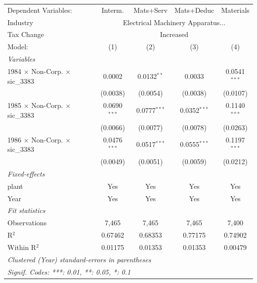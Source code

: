 \documentclass[
  12pt]{article}
\theoremstyle{definition}
\theoremstyle{remark}
\begin{document}
\begin{table}
\begin{minipage}{\linewidth}
\begin{tabular}{lcccc}
   \tabularnewline \midrule \midrule
   Dependent Variables:                          & Interm.        & Mats+Serv      & Mats+Deduc     & Materials\\  
   Industry & \multicolumn{4}{c}{Electrical Machinery Apparatus...} \\ 
   Tax Change & \multicolumn{4}{c}{Increased} \\ 
   Model:                                        & (1)            & (2)            & (3)            & (4)\\  
   \midrule
   \emph{Variables}\\
   1984 $\times$ Non-Corp. $\times$ sic\_3383    & 0.0002         & 0.0132$^{**}$  & 0.0033         & 0.0541$^{***}$\\   
                                                 & (0.0038)       & (0.0054)       & (0.0038)       & (0.0107)\\   
   1985 $\times$ Non-Corp. $\times$ sic\_3383    & 0.0690$^{***}$ & 0.0777$^{***}$ & 0.0352$^{***}$ & 0.1140$^{***}$\\   
                                                 & (0.0066)       & (0.0077)       & (0.0078)       & (0.0263)\\   
   1986 $\times$ Non-Corp. $\times$ sic\_3383    & 0.0476$^{***}$ & 0.0517$^{***}$ & 0.0555$^{***}$ & 0.1197$^{***}$\\   
                                                 & (0.0049)       & (0.0051)       & (0.0059)       & (0.0212)\\   
   \midrule
   \emph{Fixed-effects}\\
   plant                                         & Yes            & Yes            & Yes            & Yes\\  
   Year                                          & Yes            & Yes            & Yes            & Yes\\  
   \midrule
   \emph{Fit statistics}\\
   Observations                                  & 7,465          & 7,465          & 7,465          & 7,400\\  
   R$^2$                                         & 0.67462        & 0.68353        & 0.77175        & 0.74902\\  
   Within R$^2$                                  & 0.01175        & 0.01353        & 0.01353        & 0.00479\\  
   \midrule \midrule
   \multicolumn{5}{l}{\emph{Clustered (Year) standard-errors in parentheses}}\\
   \multicolumn{5}{l}{\emph{Signif. Codes: ***: 0.01, **: 0.05, *: 0.1}}\\
\end{tabular}
\par\endgroup

\end{minipage}%

\end{table}%
\end{document}
